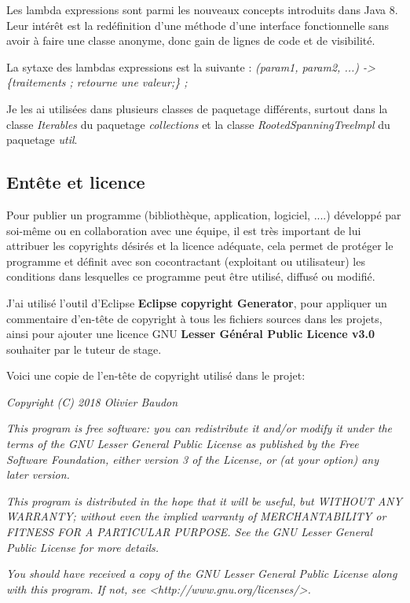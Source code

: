 \documentclass[12pt]{report}
\begin{document}
Les lambda expressions sont parmi les nouveaux concepts introduits dans Java 8. Leur intérêt est la redéfinition d'une méthode d'une interface fonctionnelle sans avoir à faire une classe anonyme, donc gain de lignes de code et de visibilité.\newline

La sytaxe des lambdas expressions est la suivante :\newline
\textit{(param1, param2, ...) -> \{traitements ; retourne une valeur;\} ;} \newline

Je les ai utilisées dans plusieurs classes de paquetage différents, surtout dans la classe \textit{Iterables} du paquetage \textit{collections} et la classe \textit{RootedSpanningTreelmpl} du paquetage \textit{util}.\newline

\subsection{Entête et licence}

Pour publier un programme (bibliothèque, application, logiciel, ....) développé par soi-même ou en collaboration avec une équipe, il est très important de lui attribuer les copyrights désirés et la licence adéquate, cela permet de protéger le programme et définit avec son cocontractant (exploitant ou utilisateur) les conditions dans lesquelles ce programme peut être utilisé, diffusé ou modifié.\newline

J'ai utilisé l'outil d'Eclipse \textbf{Eclipse copyright Generator}, pour appliquer un commentaire d'en-tête de copyright à tous les fichiers sources dans les projets, ainsi pour ajouter une licence GNU \textbf{Lesser Général Public Licence v3.0} souhaiter par le tuteur de stage.\newline 

Voici une copie de l'en-tête de copyright utilisé dans le projet:\newline
\newpage
\begin{center}
\textit{Copyright (C) 2018 Olivier Baudon}

\textit{This program is free software: you can redistribute it and/or modify}
\textit{it under the terms of the GNU Lesser General Public License as published by}
\textit{the Free Software Foundation, either version 3 of the License, or}
\textit{(at your option) any later version.}

\textit{This program is distributed in the hope that it will be useful,}
\textit{but WITHOUT ANY WARRANTY; without even the implied warranty of}
\textit{MERCHANTABILITY or FITNESS FOR A PARTICULAR PURPOSE.  See the}
\textit{GNU Lesser General Public License for more details.}

\textit{You should have received a copy of the GNU Lesser General Public License}
\textit{along with this program.  If not, see <http://www.gnu.org/licenses/>.}
\end{center}
\end{document}
